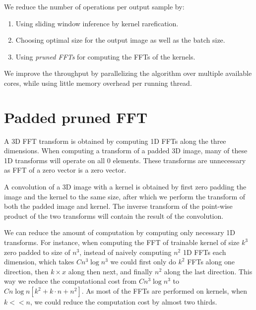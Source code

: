 \documentclass[conference]{IEEEtran}
\begin{document}
We reduce the number of operations per output sample by:
\begin{enumerate}
\item Using sliding window inference by kernel rarefication.
\item Choosing optimal size for the output image as well as the batch
  size.
\item Using \emph{pruned FFTs} for computing the FFTs of the kernels.
\end{enumerate}

We improve the throughput by parallelizing the algorithm over multiple
available cores, while using little memory overhead per running
thread.


\section{Padded pruned FFT}

A 3D FFT transform is obtained by computing 1D FFTs along the three
dimensions.  When computing a transform of a padded 3D image, many of
these 1D transforms will operate on all $0$ elements.  These
transforms are unnecessary as FFT of a zero vector is a zero vector.

A convolution of a 3D image with a kernel is obtained by first zero
padding the image and the kernel to the same size, after which we
perform the transform of both the padded image and kernel.  The
inverse transform of the point-wise product of the two transforms will
contain the result of the convolution.

We can reduce the amount of computation by computing only necessary 1D
transforms.  For instance, when computing the FFT of trainable kernel
of size $k^3$ zero padded to size of $n^3$, instead of naively
computing $n^2$ 1D FFTs each dimension, which takes $C n^3 \log n^3$
we could first only do $k^2$ FFTs along one direction, then $k \times
x$ along then next, and finally $n^2$ along the last direction.  This
way we reduce the computational cost from $C n^3 \log n^3$ to $C n\log
n[k^2 + k \cdot n + n^2]$.  As most of the FFTs are performed on
kernels, when $k << n$, we could reduce the computation cost by almost
two thirds.
\end{document}
